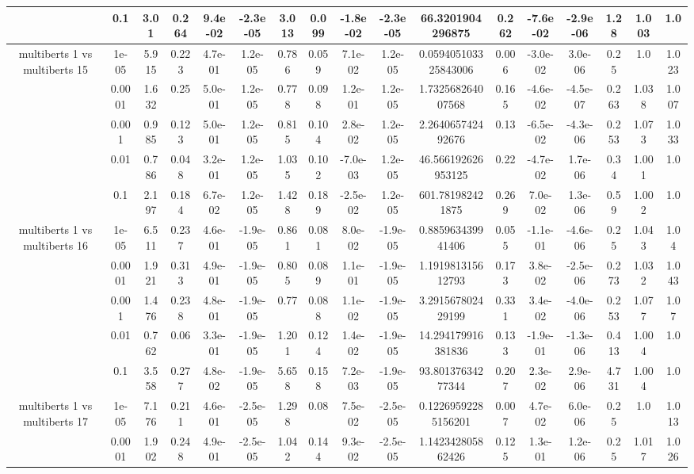 \begin{tabular}{|c|c|c|c|c|c|c|c|c|c|c|c|c|c|c|c|c|}
 & 0.1 & 3.01 & 0.264 & 9.4e-02 & -2.3e-05 & 3.013 & 0.099 & -1.8e-02 & -2.3e-05 & 66.3201904296875 & 0.262 & -7.6e-02 & -2.9e-06 & 1.28 & 1.003 & 1.0 \\
\hline
\multirow{5}{*}{multiberts 1 vs multiberts 15} & 1e-05 & 5.915 & 0.223 & 4.7e-01 & 1.2e-05 & 0.786 & 0.059 & 7.1e-02 & 1.2e-05 & 0.059405103325843006 & 0.006 & -3.0e-02 & 3.0e-06 & 0.25 & 1.0 & 1.023 \\
 & 0.0001 & 1.632 & 0.25 & 5.0e-01 & 1.2e-05 & 0.778 & 0.098 & 1.2e-01 & 1.2e-05 & 1.732568264007568 & 0.165 & -4.6e-02 & -4.5e-07 & 0.263 & 1.038 & 1.007 \\
 & 0.001 & 0.985 & 0.123 & 5.0e-01 & 1.2e-05 & 0.815 & 0.104 & 2.8e-02 & 1.2e-05 & 2.264065742492676 & 0.13 & -6.5e-02 & -4.3e-06 & 0.253 & 1.073 & 1.033 \\
 & 0.01 & 0.786 & 0.048 & 3.2e-01 & 1.2e-05 & 1.035 & 0.102 & -7.0e-03 & 1.2e-05 & 46.566192626953125 & 0.22 & -4.7e-02 & 1.7e-06 & 0.34 & 1.001 & 1.0 \\
 & 0.1 & 2.197 & 0.184 & 6.7e-02 & 1.2e-05 & 1.428 & 0.189 & -2.5e-02 & 1.2e-05 & 601.781982421875 & 0.269 & 7.0e-02 & 1.3e-06 & 0.59 & 1.002 & 1.0 \\
\hline
\multirow{5}{*}{multiberts 1 vs multiberts 16} & 1e-05 & 6.511 & 0.237 & 4.6e-01 & -1.9e-05 & 0.861 & 0.081 & 8.0e-02 & -1.9e-05 & 0.885963439941406 & 0.055 & -1.1e-01 & -4.6e-06 & 0.25 & 1.043 & 1.04 \\
 & 0.0001 & 1.921 & 0.313 & 4.9e-01 & -1.9e-05 & 0.805 & 0.089 & 1.1e-01 & -1.9e-05 & 1.191981315612793 & 0.173 & 3.8e-02 & -2.5e-06 & 0.273 & 1.032 & 1.043 \\
 & 0.001 & 1.476 & 0.238 & 4.8e-01 & -1.9e-05 & 0.77 & 0.088 & 1.1e-02 & -1.9e-05 & 3.291567802429199 & 0.331 & 3.4e-02 & -4.0e-06 & 0.253 & 1.077 & 1.07 \\
 & 0.01 & 0.762 & 0.06 & 3.3e-01 & -1.9e-05 & 1.201 & 0.124 & 1.4e-02 & -1.9e-05 & 14.294179916381836 & 0.133 & -1.9e-01 & -1.3e-06 & 0.413 & 1.004 & 1.0 \\
 & 0.1 & 3.558 & 0.277 & 4.8e-02 & -1.9e-05 & 5.658 & 0.158 & 7.2e-03 & -1.9e-05 & 93.80137634277344 & 0.207 & 2.3e-02 & 2.9e-06 & 4.731 & 1.004 & 1.0 \\
\hline
\multirow{5}{*}{multiberts 1 vs multiberts 17} & 1e-05 & 7.176 & 0.211 & 4.6e-01 & -2.5e-05 & 1.298 & 0.08 & 7.5e-02 & -2.5e-05 & 0.12269592285156201 & 0.007 & 4.7e-02 & 6.0e-06 & 0.25 & 1.0 & 1.013 \\
 & 0.0001 & 1.902 & 0.248 & 4.9e-01 & -2.5e-05 & 1.042 & 0.144 & 9.3e-02 & -2.5e-05 & 1.142342805862426 & 0.125 & 1.3e-01 & 1.2e-06 & 0.25 & 1.017 & 1.026 \\

\end{tabular}
